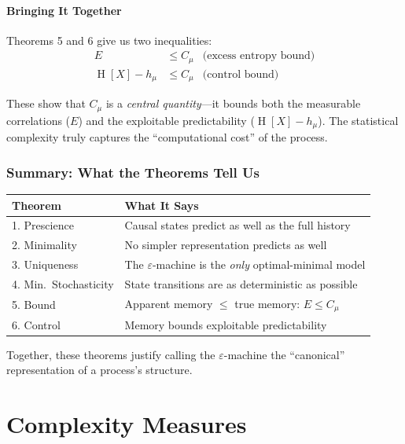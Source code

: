 \documentclass[11pt,a4paper]{article}
\theoremstyle{definition}
\theoremstyle{plain}
\newcommand{\eps}{\varepsilon}
\newcommand{\Cmu}{C_\mu}
\newcommand{\hmu}{h_\mu}
\DeclareMathOperator{\Ent}{H}
\begin{document}
\subsection{Bringing It Together}

Theorems 5 and 6 give us two inequalities:
\begin{align}
    E &\leq \Cmu & \text{(excess entropy bound)} \\
    \Ent[X] - \hmu &\leq \Cmu & \text{(control bound)}
\end{align}

These show that $\Cmu$ is a \emph{central quantity}---it bounds both the measurable correlations ($E$) and the exploitable predictability ($\Ent[X] - \hmu$). The statistical complexity truly captures the ``computational cost'' of the process.

\section{Summary: What the Theorems Tell Us}
\label{sec:theorem-summary}

\begin{center}
\begin{tabular}{lp{8cm}}
\toprule
\textbf{Theorem} & \textbf{What It Says} \\
\midrule
1. Prescience & Causal states predict as well as the full history \\
2. Minimality & No simpler representation predicts as well \\
3. Uniqueness & The $\eps$-machine is the \emph{only} optimal-minimal model \\
4. Min.\ Stochasticity & State transitions are as deterministic as possible \\
5. Bound & Apparent memory $\leq$ true memory: $E \leq \Cmu$ \\
6. Control & Memory bounds exploitable predictability \\
\bottomrule
\end{tabular}
\end{center}

Together, these theorems justify calling the $\eps$-machine the ``canonical'' representation of a process's structure.

\part{Complexity Measures}
\end{document}
